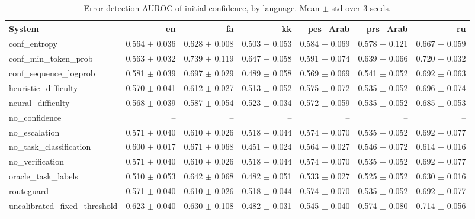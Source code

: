\begin{table}[t]
\centering
\small
\caption{Error-detection AUROC of initial confidence, by language. Mean $\pm$ std over 3 seeds.}
\label{tab:language_reliability}
\begin{tabular}{lrrrrrr}
\toprule
System & en & fa & kk & pes\_Arab & prs\_Arab & ru \\
\midrule
conf\_entropy & 0.564 $\pm$ 0.036 & 0.628 $\pm$ 0.008 & 0.503 $\pm$ 0.053 & 0.584 $\pm$ 0.069 & 0.578 $\pm$ 0.121 & 0.667 $\pm$ 0.059 \\
conf\_min\_token\_prob & 0.563 $\pm$ 0.032 & 0.739 $\pm$ 0.119 & 0.647 $\pm$ 0.058 & 0.591 $\pm$ 0.074 & 0.639 $\pm$ 0.066 & 0.720 $\pm$ 0.032 \\
conf\_sequence\_logprob & 0.581 $\pm$ 0.039 & 0.697 $\pm$ 0.029 & 0.489 $\pm$ 0.058 & 0.569 $\pm$ 0.069 & 0.541 $\pm$ 0.052 & 0.692 $\pm$ 0.063 \\
heuristic\_difficulty & 0.570 $\pm$ 0.041 & 0.612 $\pm$ 0.027 & 0.513 $\pm$ 0.052 & 0.575 $\pm$ 0.072 & 0.535 $\pm$ 0.052 & 0.696 $\pm$ 0.074 \\
neural\_difficulty & 0.568 $\pm$ 0.039 & 0.587 $\pm$ 0.054 & 0.523 $\pm$ 0.034 & 0.572 $\pm$ 0.059 & 0.535 $\pm$ 0.052 & 0.685 $\pm$ 0.053 \\
no\_confidence & -- & -- & -- & -- & -- & -- \\
no\_escalation & 0.571 $\pm$ 0.040 & 0.610 $\pm$ 0.026 & 0.518 $\pm$ 0.044 & 0.574 $\pm$ 0.070 & 0.535 $\pm$ 0.052 & 0.692 $\pm$ 0.077 \\
no\_task\_classification & 0.600 $\pm$ 0.017 & 0.671 $\pm$ 0.068 & 0.451 $\pm$ 0.024 & 0.564 $\pm$ 0.027 & 0.546 $\pm$ 0.072 & 0.614 $\pm$ 0.016 \\
no\_verification & 0.571 $\pm$ 0.040 & 0.610 $\pm$ 0.026 & 0.518 $\pm$ 0.044 & 0.574 $\pm$ 0.070 & 0.535 $\pm$ 0.052 & 0.692 $\pm$ 0.077 \\
oracle\_task\_labels & 0.510 $\pm$ 0.053 & 0.642 $\pm$ 0.068 & 0.482 $\pm$ 0.051 & 0.533 $\pm$ 0.027 & 0.525 $\pm$ 0.052 & 0.630 $\pm$ 0.016 \\
routeguard & 0.571 $\pm$ 0.040 & 0.610 $\pm$ 0.026 & 0.518 $\pm$ 0.044 & 0.574 $\pm$ 0.070 & 0.535 $\pm$ 0.052 & 0.692 $\pm$ 0.077 \\
uncalibrated\_fixed\_threshold & 0.623 $\pm$ 0.040 & 0.630 $\pm$ 0.108 & 0.482 $\pm$ 0.031 & 0.545 $\pm$ 0.040 & 0.574 $\pm$ 0.080 & 0.714 $\pm$ 0.056 \\
\bottomrule
\end{tabular}
\end{table}
